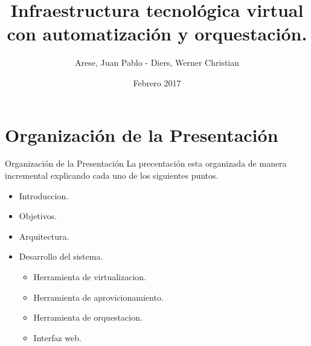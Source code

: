 \usepackage[english]{babel}
\usepackage[utf8x]{inputenc}

\title[Your Short Title]{Infraestructura tecnológica virtual con automatización y orquestación.}
\author{Arese, Juan Pablo - Diers, Werner Christian}
\date{Febrero 2017}




\begin{frame}
  \titlepage
\end{frame}


\section{Organización de la Presentación}

\begin{frame}{Organización de la Presentación}
    \vspace{-1.5cm}
    La precentación esta organizada de manera incremental explicando cada uno de los siguientes puntos.\\
    \begin{itemize}
        \item Introduccion.
        \item Objetivos.
        \item Arquitectura.
        \item Desarrollo del sistema.
        \begin{itemize}
            \item Herramienta de virtualizacion.
            \item Herramienta de aprovicionamiento.
            \item Herramienta de orquestacion.
            \item Interfaz web.
        \end{itemize}
    \end{itemize}

\end{frame}



